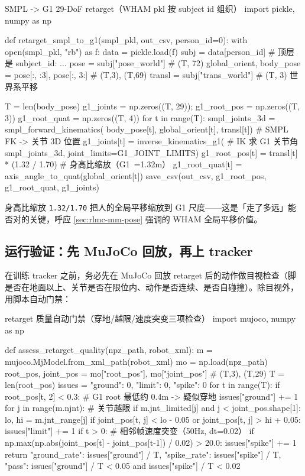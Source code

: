 \begin{codebox}[Python]{SMPL -> G1 29-DoF retarget（WHAM pkl 按 subject id 组织）}
import pickle, numpy as np

def retarget_smpl_to_g1(smpl_pkl, out_csv, person_id=0):
    with open(smpl_pkl, "rb") as f:
        data = pickle.load(f)
    subj = data[person_id]                  # 顶层是 {subject_id: {...}}
    pose = subj["pose_world"]               # (T, 72)
    global_orient, body_pose = pose[:, :3], pose[:, 3:]   # (T,3), (T,69)
    transl = subj["trans_world"]            # (T, 3) 世界系平移

    T = len(body_pose)
    g1_joints = np.zeros((T, 29)); g1_root_pos = np.zeros((T, 3))
    g1_root_quat = np.zeros((T, 4))
    for t in range(T):
        smpl_joints_3d = smpl_forward_kinematics(
            body_pose[t], global_orient[t], transl[t])    # SMPL FK -> 关节 3D 位置
        g1_joints[t] = inverse_kinematics_g1(             # IK 求 G1 关节角
            smpl_joints_3d, joint_limits=G1_JOINT_LIMITS)
        g1_root_pos[t] = transl[t] * (1.32 / 1.70)        # 身高比缩放（G1~=1.32m）
        g1_root_quat[t] = axis_angle_to_quat(global_orient[t])
    save_csv(out_csv, g1_root_pos, g1_root_quat, g1_joints)
\end{codebox}

身高比缩放 \verb|1.32/1.70| 把人的全局平移缩放到 G1 尺度——这是「走了多远」能否对的关键，呼应 \cref{sec:rlmc-mm-pose} 强调的 WHAM 全局平移价值。

\subsection{运行验证：先 MuJoCo 回放，再上 tracker}
\label{sec:rlmc-mm-video-verify}

在训练 tracker 之前，务必先在 MuJoCo 回放 retarget 后的动作做目视检查（脚是否在地面以上、关节是否在限位内、动作是否连续、是否自碰撞）。除目视外，用脚本自动门禁：

\begin{codebox}[Python]{retarget 质量自动门禁（穿地/越限/速度突变三项检查）}
import mujoco, numpy as np

def assess_retarget_quality(npz_path, robot_xml):
    m = mujoco.MjModel.from_xml_path(robot_xml)
    mo = np.load(npz_path)
    root_pos, joint_pos = mo["root_pos"], mo["joint_pos"]   # (T,3), (T,29)
    T = len(root_pos)
    issues = {"ground": 0, "limit": 0, "spike": 0}
    for t in range(T):
        if root_pos[t, 2] < 0.3:            # G1 root 最低约 0.4m -> 疑似穿地
            issues["ground"] += 1
        for j in range(m.njnt):             # 关节越限
            if m.jnt_limited[j] and j < joint_pos.shape[1]:
                lo, hi = m.jnt_range[j]
                if joint_pos[t, j] < lo - 0.05 or joint_pos[t, j] > hi + 0.05:
                    issues["limit"] += 1
        if t > 0:                           # 相邻帧速度突变（50Hz, dt=0.02）
            if np.max(np.abs(joint_pos[t] - joint_pos[t-1]) / 0.02) > 20.0:
                issues["spike"] += 1
    return {"ground_rate": issues["ground"] / T,
            "spike_rate": issues["spike"] / T,
            "pass": issues["ground"] / T < 0.05 and issues["spike"] / T < 0.02}
\end{codebox}

